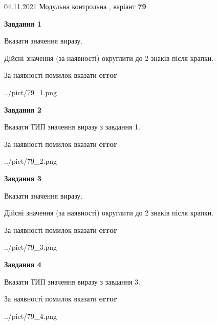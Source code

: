 \documentclass[11pt, ukrainian]{article}
\begin{document}
{04.11.2021 Модульна контрольна , варіант  \No \textbf { 79 }\par}
{
\begin {large}
{\begin {center}\textbf{Завдання 1}\end {center}}\par
Вказати значення виразу. \par
Дійсні значення (за наявності) округлити до 2 знаків після крапки. \par
За наявності помилок вказати \textbf{error}

\begin{center}
	{../pict/79_1.png}
\end{center}
\newpage

{\begin {center}\textbf{Завдання 2}\end {center}}\par
Вказати ТИП значення виразу з завдання 1. \par
За наявності помилок вказати \textbf{error}

\begin{center}
	{../pict/79_2.png}
\end{center}
\newpage

{\begin {center}\textbf{Завдання 3}\end {center}}\par
Вказати значення виразу. \par
Дійсні значення (за наявності) округлити до 2 знаків після крапки. \par
За наявності помилок вказати \textbf{error}

\begin{center}
	{../pict/79_3.png}
\end{center}
\newpage

{\begin {center}\textbf{Завдання 4}\end {center}}\par
Вказати ТИП значення виразу з завдання 3. \par
За наявності помилок вказати \textbf{error}

\begin{center}
	{../pict/79_4.png}
\end{center}
\newpage


\end{large}}
\end{document}
